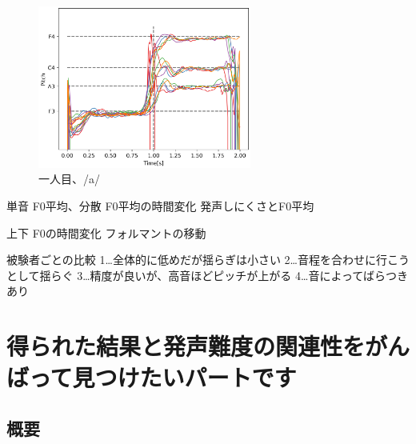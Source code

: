 \documentclass[10ptj,a4j,dvipdfmx,uplatex, oneside, openany]{jsbook}%
\begin{document}

\begin{figure}[htbp]
    \begin{center}
      \includegraphics[clip,width=7.0cm]{up_F0/1_a.png}
      \caption{一人目、/a/}
      \label{fig:1_a}
    \end{center}
\end{figure}

単音
F0平均、分散
F0平均の時間変化
発声しにくさとF0平均

上下
F0の時間変化
フォルマントの移動


被験者ごとの比較
1…全体的に低めだが揺らぎは小さい
2…音程を合わせに行こうとして揺らぐ
3…精度が良いが、高音ほどピッチが上がる
4…音によってばらつきあり

\section{得られた結果と発声難度の関連性をがんばって見つけたいパートです}
\subsection{概要}
\end{document}
